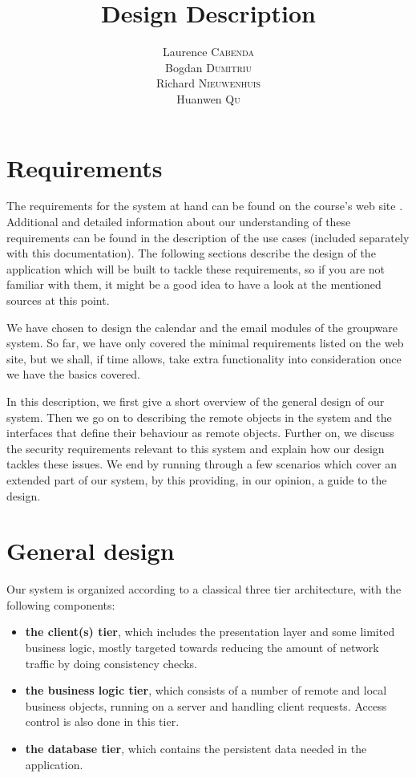 \documentclass[a4paper,10pt]{article}
\title{Design Description}
\author{Laurence \textsc{Cabenda}\\Bogdan \textsc{Dumitriu}\\Richard \textsc{Nieuwenhuis}\\Huanwen \textsc{Qu}}
\begin{document}
\maketitle

\section{Requirements}

The requirements for the system at hand can be found on the course's web site \cite{desc}.
Additional and detailed information about our understanding of these requirements can be found
in the description of the use cases (included separately with this documentation). The following
sections describe the design of the application which will be built to tackle these requirements,
so if you are not familiar with them, it might be a good idea to have a look at the mentioned
sources at this point.

We have chosen to design the calendar and the email modules of the groupware system. So far, we
have only covered the minimal requirements listed on the web site, but we shall, if time allows,
take extra functionality into consideration once we have the basics covered.

In this description, we first give a short overview of the general design of our system.
Then we go on to describing the remote objects in the system and the interfaces that define
their behaviour as remote objects. Further on, we discuss the security requirements relevant
to this system and explain how our design tackles these issues. We end by running through a
few scenarios which cover an extended part of our system, by this providing, in our opinion,
a guide to the design.

\section{General design}

Our system is organized according to a classical three tier architecture, with the following
components:

\begin{itemize}
\item \textbf{the client(s) tier}, which includes the presentation layer and some limited business
logic, mostly targeted towards reducing the amount of network traffic by doing consistency checks.
\item \textbf{the business logic tier}, which consists of a number of remote and local business
objects, running on a server and handling client requests. Access control is also done in this tier.
\item \textbf{the database tier}, which contains the persistent data needed in the application.
\end{itemize}
 
\end{document}
